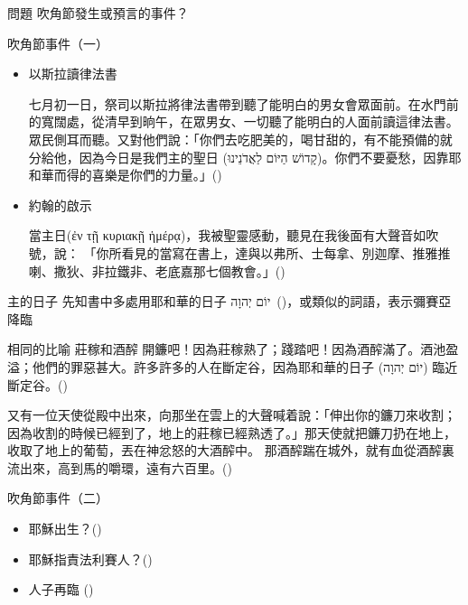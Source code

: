 \documentclass{beamer}
\newcommand{\question}[1]{
  \begin{frame}{問題}
    \centering
    \vspace*{1cm}
    \huge #1？\par
    \vfill
  \end{frame}
}
\newcommand{\parvspace}{\par\vspace{0.5em}}
\begin{document}
\question{吹角節發生或預言的事件}

\begin{frame}{吹角節事件（一）}
  \begin{itemize}
    \item 以斯拉讀律法書\par
      \alert{七月初一日}，祭司以斯拉將律法書帶到聽了能明白的男女會眾面前。在水門前的寬闊處，從清早到晌午，在眾男女、一切聽了能明白的人面前讀這律法書。眾民側耳而聽。\textellipsis{}又對他們說：「你們去吃肥美的，喝甘甜的，有不能預備的就分給他，因為今日是\alert{我們主的聖日
        (\texthebrew{קָדוֹשׁ הַיּוֹם
      לַאֲדֹנֵינוּ})}。你們不要憂愁，因靠耶和華而得的喜樂是你們的力量。」()
    \item 約翰的啟示\par
      \alert{當主日(\textgreek{ἐν τῇ κυριακῇ
      ἡμέρᾳ})}，我被聖靈感動，聽見在我後面\alert{有大聲音如吹號}，說：
      「你所看見的當寫在書上，達與以弗所、士每拿、別迦摩、推雅推喇、撒狄、非拉鐵非、老底嘉那七個教會。」()
  \end{itemize}
\end{frame}

\begin{frame}{主的日子}
  先知書中多處用\alert{耶和華的日子 \texthebrew{יוֹם יְהוָה}}\ ()，或類似的詞語，表示\alert{彌賽亞降臨}\parvspace
\end{frame}

\begin{frame}{相同的比喻 \textemdash 莊稼和酒醡}
  \alert{開鐮}吧！因為\alert{莊稼熟了}；踐踏吧！因為\alert{酒醡滿了}。酒池盈溢；他們的\alert{罪惡甚大}。許多許多的人在斷定谷，因為耶和華的日子
  (\texthebrew{יוֹם יְהוָה}) 臨近斷定谷。()\parvspace
  又有一位天使從殿中出來，向那坐在雲上的大聲喊着說：「\alert{伸出你的鐮刀來收割}；因為收割的時候已經到了，\alert{地上的莊稼已經熟透了}。」\textellipsis{}那天使就把鐮刀扔在地上，收取了地上的葡萄，丟在\alert{神忿怒的大酒醡中}。
  那酒醡踹在城外，就有血從酒醡裏流出來，\alert{高到馬的嚼環，遠有六百里}。()\parvspace
\end{frame}

\begin{frame}{吹角節事件（二）}
  \begin{itemize}
    \item 耶穌出生？()
    \item 耶穌指責法利賽人？()\parencite{YeshuaInYomTeruah}
    \item 人子再臨 ()
  \end{itemize}
\end{frame}
\end{document}
